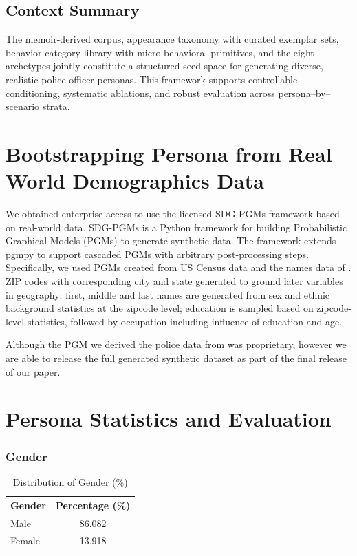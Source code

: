 \documentclass[11pt]{article}
\begin{document}
\subsection*{Context Summary}
The memoir-derived corpus, appearance taxonomy with curated exemplar sets, behavior category library with micro-behavioral primitives, and the eight archetypes jointly constitute a structured seed space for generating diverse, realistic police-officer personas. This framework supports controllable conditioning, systematic ablations, and robust evaluation across persona--by--scenario strata.

\section{Bootstrapping Persona from Real World Demographics Data}
\label{sec:persona_demographics}
We obtained enterprise access to use the licensed SDG-PGMs \citep{pgm_corneil_meyer_2025_nemotron_personas_summit} framework based on real-world data. SDG-PGMs is a Python framework for building Probabilistic Graphical Models (PGMs) to generate synthetic data. The framework extends pgmpy\citep{pgmpy} to support cascaded PGMs with arbitrary post-processing steps. Specifically, we used PGMs created from US Census data and the names data of \citet{pgm_rosenman}. ZIP codes with corresponding city and state generated to ground later variables in geography; first, middle and last names are generated from sex and ethnic background statistics at the zipcode level; education is sampled based on zipcode-level statistics, followed by occupation including influence of education and age.

Although the PGM we derived the police data from was proprietary, however we are able to release the full generated synthetic dataset as part of the final release of our paper.

\section{Persona Statistics and Evaluation}
\label{sec:persona_stats}



\subsubsection{Gender}

\begin{table}[H]
\centering
\caption{Distribution of Gender (\%)}
\begin{tabularx}{\columnwidth}{|X|c|}
\hline
\textbf{Gender} & \textbf{Percentage (\%)} \\
\hline
Male & 86.082 \\
\hline
Female & 13.918 \\
\hline
\end{tabularx}
\end{table}
\end{document}
